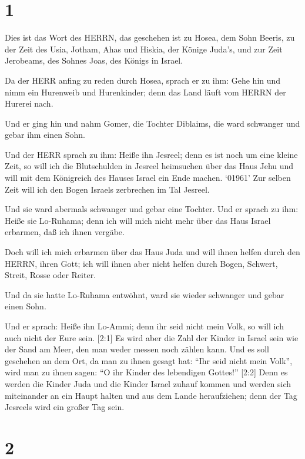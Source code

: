 \hypertarget{section}{%
\section{1}\label{section}}

 Dies ist das Wort des HERRN, das geschehen ist zu Hosea,
dem Sohn Beeris, zu der Zeit des Usia, Jotham, Ahas und Hiskia, der
Könige Juda's, und zur Zeit Jerobeams, des Sohnes Joas, des Königs in
Israel.

 Da der HERR anfing zu reden durch Hosea, sprach er zu ihm:
Gehe hin und nimm ein Hurenweib und Hurenkinder; denn das Land läuft vom
HERRN der Hurerei nach.

 Und er ging hin und nahm Gomer, die Tochter Diblaims, die
ward schwanger und gebar ihm einen Sohn.

 Und der HERR sprach zu ihm: Heiße ihn Jesreel; denn es ist
noch um eine kleine Zeit, so will ich die Blutschulden in Jesreel
heimsuchen über das Haus Jehu und will mit dem Königreich des Hauses
Israel ein Ende machen.  `01961' Zur selben Zeit will ich
den Bogen Israels zerbrechen im Tal Jesreel.

 Und sie ward abermals schwanger und gebar eine Tochter. Und
er sprach zu ihm: Heiße sie Lo-Ruhama; denn ich will mich nicht mehr
über das Haus Israel erbarmen, daß ich ihnen vergäbe.

 Doch will ich mich erbarmen über das Haus Juda und will
ihnen helfen durch den HERRN, ihren Gott; ich will ihnen aber nicht
helfen durch Bogen, Schwert, Streit, Rosse oder Reiter.

 Und da sie hatte Lo-Ruhama entwöhnt, ward sie wieder
schwanger und gebar einen Sohn.

 Und er sprach: Heiße ihn Lo-Ammi; denn ihr seid nicht mein
Volk, so will ich auch nicht der Eure sein.  {[}2:1{]} Es
wird aber die Zahl der Kinder in Israel sein wie der Sand am Meer, den
man weder messen noch zählen kann. Und es soll geschehen an dem Ort, da
man zu ihnen gesagt hat: ``Ihr seid nicht mein Volk'', wird man zu ihnen
sagen: ``O ihr Kinder des lebendigen Gottes!''  {[}2:2{]}
Denn es werden die Kinder Juda und die Kinder Israel zuhauf kommen und
werden sich miteinander an ein Haupt halten und aus dem Lande
heraufziehen; denn der Tag Jesreels wird ein großer Tag sein.

\hypertarget{section-1}{%
\section{2}\label{section-1}}

